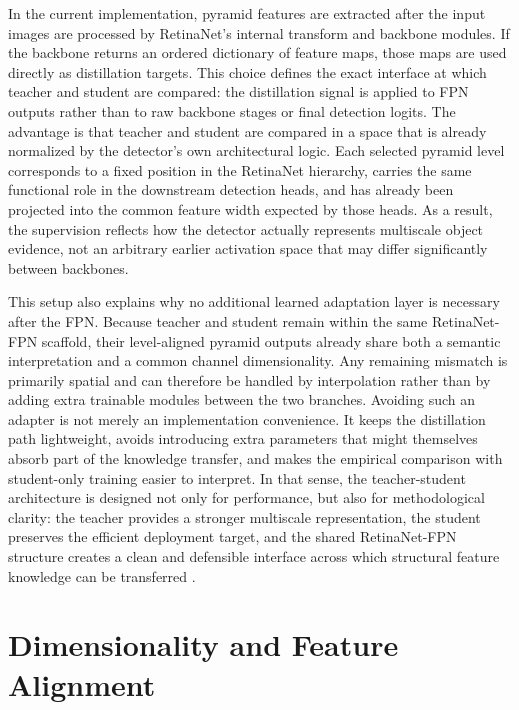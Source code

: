 In the current implementation, pyramid features are extracted after the input images are processed by RetinaNet's internal transform and backbone modules. If the backbone returns an ordered dictionary of feature maps, those maps are used directly as distillation targets. This choice defines the exact interface at which teacher and student are compared: the distillation signal is applied to FPN outputs rather than to raw backbone stages or final detection logits. The advantage is that teacher and student are compared in a space that is already normalized by the detector's own architectural logic. Each selected pyramid level corresponds to a fixed position in the RetinaNet hierarchy, carries the same functional role in the downstream detection heads, and has already been projected into the common feature width expected by those heads. As a result, the supervision reflects how the detector actually represents multiscale object evidence, not an arbitrary earlier activation space that may differ significantly between backbones.

This setup also explains why no additional learned adaptation layer is necessary after the FPN. Because teacher and student remain within the same RetinaNet-FPN scaffold, their level-aligned pyramid outputs already share both a semantic interpretation and a common channel dimensionality. Any remaining mismatch is primarily spatial and can therefore be handled by interpolation rather than by adding extra trainable modules between the two branches. Avoiding such an adapter is not merely an implementation convenience. It keeps the distillation path lightweight, avoids introducing extra parameters that might themselves absorb part of the knowledge transfer, and makes the empirical comparison with student-only training easier to interpret. In that sense, the teacher-student architecture is designed not only for performance, but also for methodological clarity: the teacher provides a stronger multiscale representation, the student preserves the efficient deployment target, and the shared RetinaNet-FPN structure creates a clean and defensible interface across which structural feature knowledge can be transferred \cite{he2016resnet,lin2017fpn,lin2017focal,hinton2015distilling,wang2019distilling,derijk2022structural}.

\section{Dimensionality and Feature Alignment}

